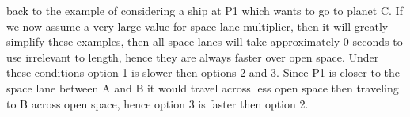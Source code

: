 back to the example of considering a ship at P1 which wants to go to planet C.
If we now assume a very large value for space lane multiplier, then it will greatly simplify these examples, then all space lanes will take approximately 0 seconds to use irrelevant to length, hence they are always faster over open space.
Under these conditions option 1 is slower then options 2 and 3.
Since P1 is closer to the space lane between A and B it would travel across less open space then traveling to B across open space, hence option 3 is faster then option 2.








